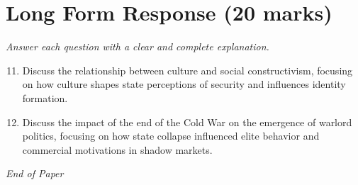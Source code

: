 \documentclass[12pt]{article}
\begin{document}
\section*{Long Form Response (20 marks)}
\textit{Answer each question with a clear and complete explanation.}
\begin{enumerate}[label=\arabic*.]
\setcounter{enumi}{10}
\item Discuss the relationship between culture and social constructivism, focusing on how culture shapes state perceptions of security and influences identity formation.
\item Discuss the impact of the end of the Cold War on the emergence of warlord politics, focusing on how state collapse influenced elite behavior and commercial motivations in shadow markets.
\end{enumerate}

\vfill
\noindent\textit{End of Paper}
\end{document}
